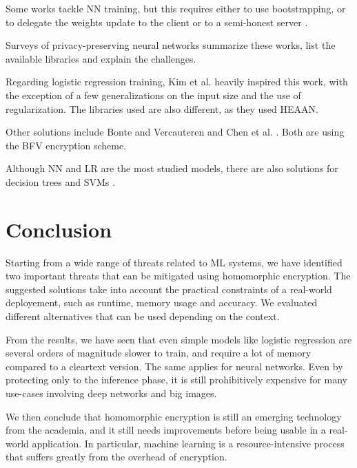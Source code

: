 \documentclass[a4paper,11pt,oneside]{report}
\begin{document}
Some works tackle NN training, but this requires either to use bootstrapping, or to delegate the weights update to the client \cite{mihara_neural_2020} or to a semi-honest server \cite{bellafqira_secure_2018}.

Surveys \cite{pulido-gaytan_privacy-preserving_2021,podschwadt_sok_2022} of privacy-preserving neural networks summarize these works, list the available libraries and explain the challenges.

Regarding logistic regression training, Kim et al. \cite{kim_logistic_2018} heavily inspired this work, with the exception of a few generalizations on the input size and the use of regularization.
The libraries used are also different, as they used HEAAN.

Other solutions include Bonte and Vercauteren \cite{bonte_privacy-preserving_2018} and Chen et al. \cite{chen_logistic_2018}.
Both are using the BFV encryption scheme.

Although NN and LR are the most studied models, there are also solutions for decision trees \cite{akavia_privacy-preserving_2019} and SVMs \cite{park_he-friendly_2020}.


\chapter{Conclusion}


Starting from a wide range of threats related to ML systems, we have identified two important threats that can be mitigated using homomorphic encryption.
The suggested solutions take into account the practical constraints of a real-world deployement, such as runtime, memory usage and accuracy.
We evaluated different alternatives that can be used depending on the context.

From the results, we have seen that even simple models like logistic regression are several orders of magnitude slower to train, and require a lot of memory compared to a cleartext version. 
The same applies for neural networks. 
Even by protecting only to the inference phase, it is still prohibitively expensive for many use-cases involving deep networks and big images.

We then conclude that homomorphic encryption is still an emerging technology from the academia, and it still needs improvements before being usable in a real-world application. 
In particular, machine learning is a resource-intensive process that suffers greatly from the overhead of encryption.
\end{document}
